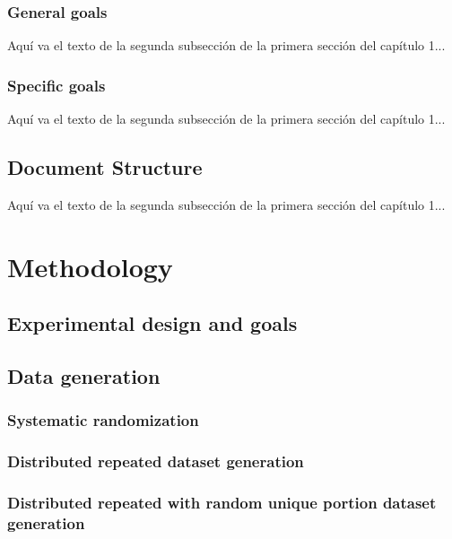 \documentclass{iccmemoria}
\begin{document}
\subsection{General goals}
Aquí va el texto de la segunda subsección de la primera sección del capítulo 1...

\subsection{Specific goals}
Aquí va el texto de la segunda subsección de la primera sección del capítulo 1...

\section{Document Structure}
Aquí va el texto de la segunda subsección de la primera sección del capítulo 1...



\chapter{Methodology}
\section{Experimental design and goals}
\section{Data generation}
\subsection{Systematic randomization}
\subsection{Distributed repeated dataset generation}
\subsection{Distributed repeated with random unique portion dataset generation}
\end{document}
